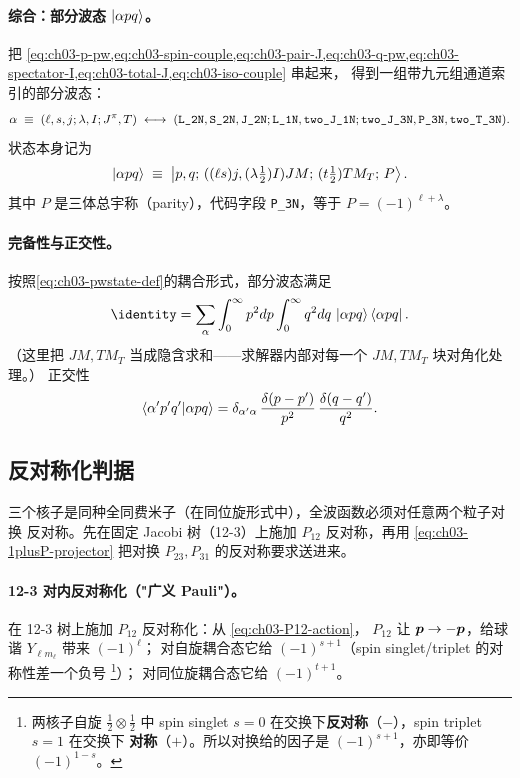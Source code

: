 \paragraph{综合：部分波态 \(\ket{\alpha p q}\)。}
把 \cref{eq:ch03-p-pw,eq:ch03-spin-couple,eq:ch03-pair-J,eq:ch03-q-pw,eq:ch03-spectator-I,eq:ch03-total-J,eq:ch03-iso-couple} 串起来，
得到一组带九元组通道索引的部分波态：
\begin{equation}
\label{eq:ch03-alpha-tuple}
\PWchan
\;\equiv\;
\PWtuple
\;\longleftrightarrow\;
(\verb|L_2N|, \verb|S_2N|, \verb|J_2N|; \verb|L_1N|, \verb|two_J_1N|;
 \verb|two_J_3N|, \verb|P_3N|, \verb|two_T_3N|).
\end{equation}
状态本身记为
\begin{equation}
\label{eq:ch03-pwstate-def}
\ket{\alpha p q}
\;\equiv\;
\ket{p, q;\,((\ell s) j, (\lambda\tfrac{1}{2}) I) J M;\,(t\tfrac{1}{2}) T M_T;\,P}.
\end{equation}
其中 \(P\) 是三体总宇称（parity），代码字段 \verb|P_3N|，等于
\(P = (-1)^{\ell + \lambda}\)。

\paragraph{完备性与正交性。}
按照\cref{eq:ch03-pwstate-def}的耦合形式，部分波态满足
\begin{equation}
\label{eq:ch03-pw-completeness}
\identity
= \sum_{\PWchan} \int_0^\infty p^2 dp \int_0^\infty q^2 dq\,
  \pwstate{\PWchan p q}\bra{\PWchan p q}.
\end{equation}
（这里把 \(JM, T M_T\) 当成隐含求和——求解器内部对每一个 \(JM, T M_T\) 块对角化处理。）
正交性
\begin{equation}
\langle \alpha' p' q' | \alpha p q \rangle
= \delta_{\alpha' \alpha}\,\frac{\delta(p - p')}{p^2}\,\frac{\delta(q - q')}{q^2}.
\end{equation}

\subsection{反对称化判据}
\label{subsec:ch03-antisymmetrize}

三个核子是同种全同费米子（在同位旋形式中），全波函数必须对任意两个粒子对换
反对称。先在固定 Jacobi 树（12-3）上施加 \(P_{12}\) 反对称，再用
\cref{eq:ch03-1plusP-projector} 把对换 \(P_{23}, P_{31}\) 的反对称要求送进来。

\paragraph{12-3 对内反对称化（"广义 Pauli"）。}
在 12-3 树上施加 \(P_{12}\) 反对称化：从 \cref{eq:ch03-P12-action}，
\(P_{12}\) 让 \(\bm{p} \to -\bm{p}\)，给球谐 \(Y_{\ell m_\ell}\) 带来
\((-1)^\ell\)；
对自旋耦合态它给 \((-1)^{s+1}\)（spin singlet/triplet 的对称性差一个负号
\footnote{两核子自旋 \(\tfrac{1}{2}\otimes\tfrac{1}{2}\) 中 spin singlet
\(s=0\) 在交换下\textbf{反对称}（\(-\)），spin triplet \(s=1\) 在交换下
\textbf{对称}（\(+\)）。所以对换给的因子是 \((-1)^{s+1}\)，亦即等价
\((-1)^{1-s}\)。}）；
对同位旋耦合态它给 \((-1)^{t+1}\)。

